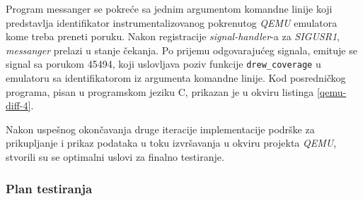 \documentclass[12pt,oneside]{memoir}
\newcommand{\kod}[1]{\texttt{#1}}
\newcommand{\strano}[1]{\textit{#1}}
\begin{document}
Program messanger se pokreće sa jednim argumentom komandne linije koji predstavlja identifikator instrumentalizovanog pokrenutog \strano{QEMU} emulatora kome treba preneti poruku. Nakon registracije \strano{signal-handler}-a za \strano{SIGUSR1}, \strano{messanger} prelazi u stanje čekanja. Po prijemu odgovarajućeg signala, emituje se signal sa porukom 45494, koji uslovljava poziv funkcije \kod{drew\_coverage} u emulatoru sa identifikatorom iz argumenta komandne linije. Kod posredničkog programa, pisan u programskom jeziku C, prikazan je u okviru listinga \ref{qemu-diff-4}.

Nakon uspešnog okončavanja druge iteracije implementacije podrške za prikupljanje i prikaz podataka u toku izvršavanja u okviru projekta \strano{QEMU}, stvorili su se optimalni uslovi za finalno testiranje. 

\subsubsection{Plan testiranja}
\end{document}
